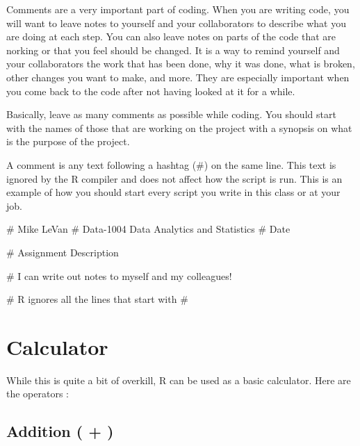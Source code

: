 \documentclass[
  letterpaper,
  DIV=11,
  numbers=noendperiod]{scrreprt}
\newenvironment{Shaded}{\begin{snugshade}}{\end{snugshade}}
\newcommand{\CommentTok}[1]{\textcolor[rgb]{0.37,0.37,0.37}{#1}}
\begin{document}

Comments are a very important part of coding. When you are writing code,
you will want to leave notes to yourself and your collaborators to
describe what you are doing at each step. You can also leave notes on
parts of the code that are norking or that you feel should be changed.
It is a way to remind yourself and your collaborators the work that has
been done, why it was done, what is broken, other changes you want to
make, and more. They are especially important when you come back to the
code after not having looked at it for a while.

Basically, leave as many comments as possible while coding. You should
start with the names of those that are working on the project with a
synopsis on what is the purpose of the project.

A comment is any text following a hashtag (\#) on the same line. This
text is ignored by the R compiler and does not affect how the script is
run. This is an example of how you should start every script you write
in this class or at your job.

\begin{Shaded}
\begin{Highlighting}[]
\CommentTok{\# Mike LeVan}
\CommentTok{\# Data{-}1004 Data Analytics and Statistics}
\CommentTok{\# Date}

\CommentTok{\# Assignment Description}

\CommentTok{\# I can write out notes to myself and my colleagues!}

\CommentTok{\# R ignores all the lines that start with \#}
\end{Highlighting}
\end{Shaded}

\section*{Calculator}\label{calculator}


While this is quite a bit of overkill, R can be used as a basic
calculator. Here are the operators :

\subsection*{Addition ( + )}\label{addition}
\end{document}
